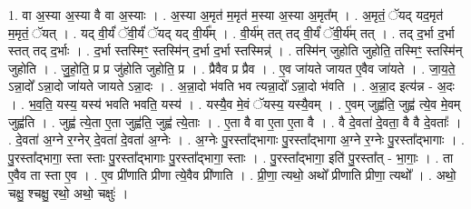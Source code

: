 \documentclass[17pt]{extarticle}
\begin{document}
1. वा अ॒स्या अ॒स्या वै वा अ॒स्याः । . अ॒स्या अ॒मृत॑ म॒मृत॑ म॒स्या अ॒स्या अ॒मृत᳚म् । . अ॒मृतं॒ ॅयद् यद॒मृत॑ म॒मृतं॒ ॅयत् । . यद् वी॒र्यं॑ ॅवी॒र्यं॑ ॅयद् यद् वी॒र्य᳚म् । . वी॒र्य॑म् तत् तद् वी॒र्यं॑ ॅवी॒र्य॑म् तत् । . तद् द॒र्भा द॒र्भा स्तत् तद् द॒र्भाः । . द॒र्भा स्तस्मिꣳ॒॒ स्तस्मि॑न् द॒र्भा द॒र्भा स्तस्मिन्न्॑ । . तस्मि॑न् जुहोति जुहोति॒ तस्मिꣳ॒॒ स्तस्मि॑न् जुहोति । . जु॒हो॒ति॒ प्र प्र जु॑होति जुहोति॒ प्र । . प्रैवैव प्र प्रैव । . ए॒व जा॑यते जायत ए॒वैव जा॑यते । . जा॒य॒ते॒ ऽन्ना॒दो᳚ ऽन्ना॒दो जा॑यते जायते ऽन्ना॒दः । . अ॒न्ना॒दो भ॑वति भव त्यन्ना॒दो᳚ ऽन्ना॒दो भ॑वति । . अ॒न्ना॒द इत्य॑न्न - अ॒दः । . भ॒व॒ति॒ यस्य॒ यस्य॑ भवति भवति॒ यस्य॑ । . यस्यै॒व मे॒वं ॅयस्य॒ यस्यै॒वम् । . ए॒वम् जुह्व॑ति॒ जुह्व॑ त्ये॒व मे॒वम् जुह्व॑ति । . जुह्व॑ त्ये॒ता ए॒ता जुह्व॑ति॒ जुह्व॑ त्ये॒ताः । . ए॒ता वै वा ए॒ता ए॒ता वै । . वै दे॒वता॑ दे॒वता॒ वै वै दे॒वताः᳚ । . दे॒वता॑ अ॒ग्ने र॒ग्नेर् दे॒वता॑ दे॒वता॑ अ॒ग्नेः । . अ॒ग्नेः पु॒रस्ता᳚द्भागाः पु॒रस्ता᳚द्भागा अ॒ग्ने र॒ग्नेः पु॒रस्ता᳚द्भागाः । . पु॒रस्ता᳚द्भागा॒ स्ता स्ताः पु॒रस्ता᳚द्भागाः पु॒रस्ता᳚द्भागा॒ स्ताः । . पु॒रस्ता᳚द्भागा॒ इति॑ पु॒रस्ता᳚त् - भा॒गाः॒ । . ता ए॒वैव ता स्ता ए॒व । . ए॒व प्री॑णाति प्रीणा त्ये॒वैव प्री॑णाति । . प्री॒णा॒ त्यथो॒ अथो᳚ प्रीणाति प्रीणा॒ त्यथो᳚ । . अथो॒ चक्षु॒ श्चक्षु॒ रथो॒ अथो॒ चक्षुः॑ । \newline
\end{document}
